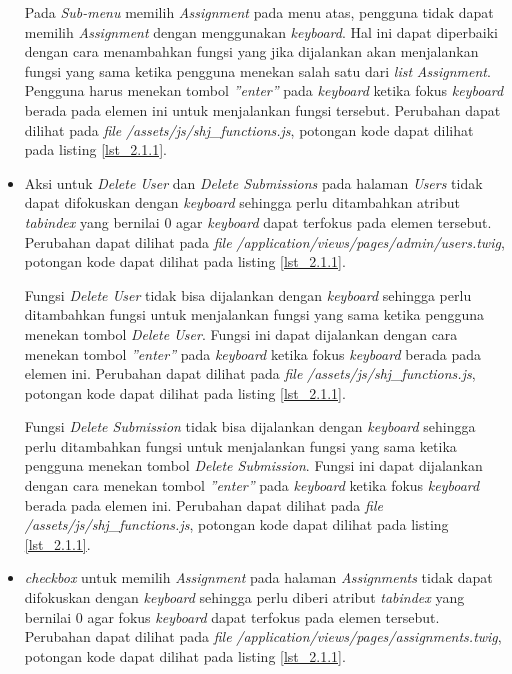 \begin{itemize}
	Pada \textit{Sub-menu} memilih \textit{Assignment} pada menu atas, pengguna tidak dapat memilih \textit{Assignment} dengan menggunakan \textit{keyboard}. Hal ini dapat diperbaiki dengan cara menambahkan fungsi yang jika dijalankan akan menjalankan fungsi yang sama ketika pengguna menekan salah satu dari \textit{list} \textit{Assignment}. Pengguna harus menekan tombol \textit{''enter''} pada \textit{keyboard} ketika fokus \textit{keyboard} berada pada elemen ini untuk menjalankan fungsi tersebut. Perubahan dapat dilihat pada \textit{file} \textit{/assets/js/shj\_functions.js}, potongan kode dapat dilihat pada listing \ref{lst_2.1.1}.
	
	\item Aksi untuk \textit{Delete User} dan \textit{Delete Submissions} pada halaman \textit{Users} tidak dapat difokuskan dengan \textit{keyboard} sehingga perlu ditambahkan atribut \textit{tabindex} yang bernilai 0 agar \textit{keyboard} dapat terfokus pada elemen tersebut. Perubahan dapat dilihat pada \textit{file} \textit{/application/views/pages/admin/users.twig}, potongan kode dapat dilihat pada listing \ref{lst_2.1.1}.

	Fungsi \textit{Delete User} tidak bisa dijalankan dengan \textit{keyboard} sehingga perlu ditambahkan fungsi untuk menjalankan fungsi yang sama ketika pengguna menekan tombol \textit{Delete User}. Fungsi ini dapat dijalankan dengan cara menekan tombol \textit{''enter''} pada \textit{keyboard} ketika fokus \textit{keyboard} berada pada elemen ini. Perubahan dapat dilihat pada \textit{file} \textit{/assets/js/shj\_functions.js}, potongan kode dapat dilihat pada listing \ref{lst_2.1.1}.

	Fungsi \textit{Delete Submission} tidak bisa dijalankan dengan \textit{keyboard} sehingga perlu ditambahkan fungsi untuk menjalankan fungsi yang sama ketika pengguna menekan tombol \textit{Delete Submission}. Fungsi ini dapat dijalankan dengan cara menekan tombol \textit{''enter''} pada \textit{keyboard} ketika fokus \textit{keyboard} berada pada elemen ini. Perubahan dapat dilihat pada \textit{file} \textit{/assets/js/shj\_functions.js}, potongan kode dapat dilihat pada listing \ref{lst_2.1.1}.

	\item \textit{checkbox} untuk memilih \textit{Assignment} pada halaman \textit{Assignments} tidak dapat difokuskan dengan \textit{keyboard} sehingga perlu diberi atribut \textit{tabindex} yang bernilai 0 agar fokus \textit{keyboard} dapat terfokus pada elemen tersebut. Perubahan dapat dilihat pada \textit{file} \textit{/application/views/pages/assignments.twig}, potongan kode dapat dilihat pada listing \ref{lst_2.1.1}.


\end{itemize}
